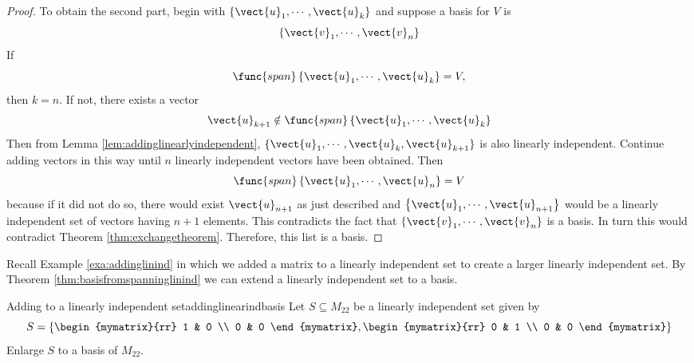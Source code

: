 \begin{proof}
To obtain the second part, begin with $\{\vect{u}_{1},\cdots ,\vect{u}
_{k}\}$ and suppose a basis for $V$ is 
\begin{equation*}
\left\{ \vect{v}_{1},\cdots ,\vect{v}_{n}\right\} 
\end{equation*}
If 
\begin{equation*}
\func{span}\left\{ \vect{u}_{1},\cdots ,\vect{u}_{k}\right\} =V,
\end{equation*}
then $k=n$. If not, there exists a vector 
\begin{equation*}
\vect{u}_{k+1}\notin \func{span}\left\{ \vect{u}_{1},\cdots ,\vect{u}
_{k}\right\}
\end{equation*}
Then from Lemma \ref{lem:addinglinearlyindependent}, $\{\vect{u}_{1},\cdots ,\vect{u}_{k},
\vect{u}_{k+1}\}$ is also linearly independent. Continue adding vectors in
this way until $n$ linearly independent vectors have been obtained. Then 
\begin{equation*}
\func{span}\left\{ \vect{u}_{1},\cdots ,\vect{u}_{n}\right\} =V
\end{equation*}
because if it did not do so, there would exist $\vect{u}_{n+1}$ as just
described and $\left\{ \vect{u}_{1},\cdots ,\vect{u}_{n+1}\right\} $
would be a linearly independent set of vectors having $n+1$ elements. This contradicts the fact that $\left\{ \vect{v}_{1},\cdots ,\vect{v}_{n}\right\} $ is a basis.
 In turn this would contradict Theorem \ref{thm:exchangetheorem}. Therefore, this list is a
basis. 
\end{proof}

Recall Example \ref{exa:addinglinind} in which we added a matrix to a linearly independent set to create a larger linearly independent set. By Theorem \ref{thm:basisfromspanninglinind} we can extend a linearly independent set to a basis.  

\begin{example}{Adding to a linearly independent set}{addinglinearindbasis}
Let $S \subseteq M_{22}$ be a linearly independent set given by 
\[
S  = \left\{ \begin{mymatrix}{rr}
1 & 0 \\
0 & 0 
\end{mymatrix}, \begin{mymatrix}{rr}
0 & 1 \\
0 & 0 
\end{mymatrix} \right\}
\]
Enlarge $S$ to a basis of $M_{22}$. 
\end{example}

